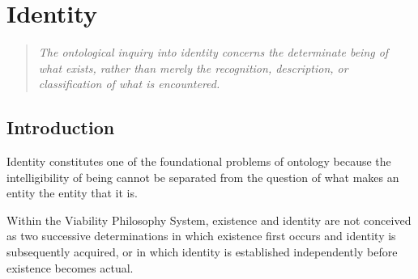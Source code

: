 
%
%
%
%
%
%
%
%
%



\chapter{Identity}
\label{ch:identity}



\def\CurrentChapterID{VS.B01.P01.C01}
\def\CurrentChapterTitle{Identity}



\begin{quote}
\textit{
The ontological inquiry into identity concerns the
determinate being of what exists, rather than merely
the recognition, description, or classification of
what is encountered.
}
\end{quote}



\section*{Introduction}

Identity constitutes one of the foundational problems
of ontology because the intelligibility of being cannot
be separated from the question of what makes an entity
the entity that it is.

Within the Viability Philosophy System, existence and
identity are not conceived as two successive
determinations in which existence first occurs and
identity is subsequently acquired, or in which identity
is established independently before existence becomes
actual.


